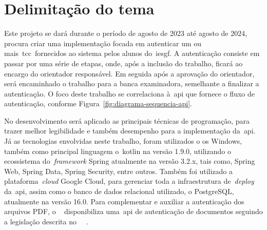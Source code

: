 \section{Delimitação do tema}\label{sec:delimitacao-do-tema}

Este projeto se dará durante o período de agosto de 2023 até agosto
de 2024, procura criar uma implementação focada em autenticar um ou
mais~\acrfull{tcc}~fornecidos ao sistema pelos alunos do~\acrfull{iesgf}.
A autenticação consiste em passar por uma série de etapas,
onde, após a inclusão do trabalho, ficará ao encargo do orientador
responsável.
Em seguida após a aprovação do orientador, será encaminhado o trabalho
para a banca examinadora, semelhante a finalizar a autenticação.
O foco deste trabalho se correlaciona à~\acrshort{api} que fornece o
fluxo de autenticação, conforme Figura~\ref{fig:diagrama-sequencia-api}.

No desenvolvimento será aplicado as principais técnicas de
programação, para trazer melhor legibilidade e também desempenho
para a implementação da~\acrshort{api}.
Já as tecnologias envolvidas neste trabalho, foram utilizados o \acrfull{os}
Windows, também como principal linguagem o~\acrfull{kotlin} na
versão 1.9.0, utilizando o ecossistema do~\textit{framework} Spring
atualmente na versão 3.2.x, tais como, Spring Web, Spring Data,
Spring Security, entre outros.
Também foi utilizado a plataforma~\textit{cloud} Google Cloud, para
gerenciar toda a infraestrutura de~\textit{deploy} da~\acrshort{api},
assim como o banco de dados relacional utilizado, o PostgreSQL,
atualmente na versão 16.0.
Para complementar e auxiliar a autenticação dos arquivos PDF, o
~\citeauthor*{decreto112020} disponibiliza uma~\acrshort{api} de
autenticação de documentos seguindo a legislação descrita no
~~\cite{decreto112020}.


